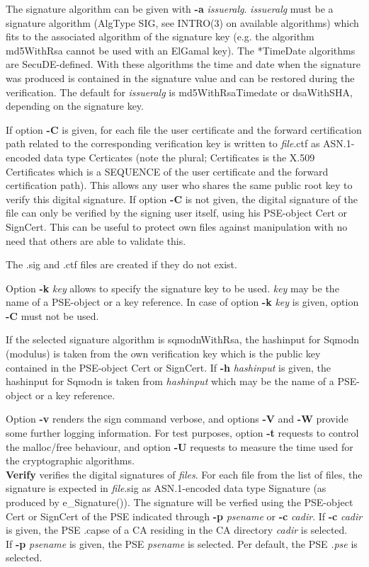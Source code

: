 The signature algorithm can be given with {\bf -a} {\em issueralg}. 
{\em issueralg} must be a
signature algorithm (AlgType SIG, see INTRO(3) on available algorithms) which fits to the associated 
algorithm
of the signature key (e.g. the algorithm md5WithRsa cannot be used with an ElGamal key). The *TimeDate 
algorithms
are SecuDE-defined. With these algorithms the time and date when the signature was produced is 
contained
in the signature value and can be restored during the verification.
The default for {\em issueralg} is md5WithRsaTimedate or dsaWithSHA, depending on the signature key. 

If option {\bf -C} is given, for each file the user certificate and the forward certification path related to
the corresponding verification key is written to {\em file}.ctf as ASN.1-encoded data type Certicates 
(note the plural; Certificates is the X.509 Certificates which is a SEQUENCE of the user certificate and
the forward certification path). This allows any user who shares the same public root key to verify
this digital signature. If option {\bf -C} is not given, the digital signature of the file can only be
verified by the signing user itself, using his PSE-object Cert or SignCert. This can be useful to
protect own files against manipulation with no need that others are able to validate this.

The .sig and .ctf files are created if they do not exist.
 
Option {\bf -k} {\em key} allows to specify the signature key to be used. {\em key} may
be the name of a PSE-object or a key reference. In case of option {\bf -k} {\em key} is given,
option {\bf -C} must not be used.

If the selected signature algorithm is sqmodnWithRsa, the hashinput for Sqmodn (modulus) is taken 
from the own verification key which is the public key contained in the PSE-object Cert or SignCert.
If {\bf -h} {\em hashinput} is given, the hashinput for Sqmodn is taken from {\em hashinput}
which may be the name of a PSE-object or a key reference.

Option {\bf -v} renders the sign command verbose, and options {\bf -V} and {\bf -W} provide some further
logging information. For test purposes, option {\bf -t} requests
to control the malloc/free behaviour, and option {\bf -U} requests to measure the time used for the 
cryptographic
algorithms.
\\ [1em]

{\bf Verify} verifies the digital signatures of {\em files}. For each file from the list of files, 
the signature is expected in {\em file}.sig
as ASN.1-encoded data type Signature (as produced by e\_Signature()). The signature will be verfied using 
the PSE-object Cert or SignCert
of the PSE indicated through {\bf -p} {\em psename} or {\bf -c} {\em cadir}.
If {\bf -c} {\em cadir} is given, the PSE .capse of a CA residing in the CA directory {\em cadir}
is selected. \\
If {\bf -p} {\em psename} is given, the PSE {\em psename} is selected. Per default, the PSE {\em .pse} 
is selected.

